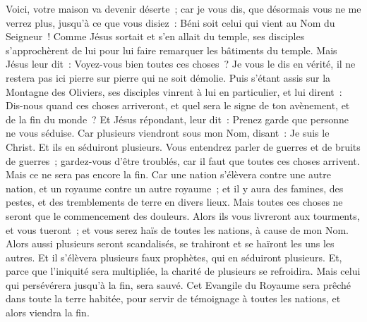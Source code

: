 \begin{multicols}{2}
Voici, votre maison va devenir déserte~;
car je vous dis, que désormais vous ne me verrez plus, jusqu'à ce que vous disiez~: Béni soit celui qui vient au Nom du Seigneur~!
\VerseOne{}Comme Jésus sortait et s'en allait du temple, ses disciples s'approchèrent de lui pour lui faire remarquer les bâtiments du temple.
Mais Jésus leur dit~: Voyez-vous bien toutes ces choses~? Je vous le dis en vérité, il ne restera pas ici pierre sur pierre qui ne soit démolie.
Puis s'étant assis sur la Montagne des Oliviers, ses disciples vinrent à lui en particulier, et lui dirent~: Dis-nous quand ces choses arriveront, et quel sera le signe de ton avènement, et de la fin du monde~?
Et Jésus répondant, leur dit~: Prenez garde que personne ne vous séduise.
Car plusieurs viendront sous mon Nom, disant~: Je suis le Christ. Et ils en séduiront plusieurs.
Vous entendrez parler de guerres et de bruits de guerres~; gardez-vous d'être troublés, car il faut que toutes ces choses arrivent. Mais ce ne sera pas encore la fin.
Car une nation s'élèvera contre une autre nation, et un royaume contre un autre royaume~; et il y aura des famines, des pestes, et des tremblements de terre en divers lieux.
Mais toutes ces choses ne seront que le commencement des douleurs.
Alors ils vous livreront aux tourments, et vous tueront~; et vous serez haïs de toutes les nations, à cause de mon Nom.
Alors aussi plusieurs seront scandalisés, se trahiront et se haïront les uns les autres.
Et il s'élèvera plusieurs faux prophètes, qui en séduiront plusieurs.
Et, parce que l'iniquité sera multipliée, la charité de plusieurs se refroidira.
Mais celui qui persévérera jusqu'à la fin, sera sauvé.
Cet Evangile du Royaume sera prêché dans toute la terre habitée, pour servir de témoignage à toutes les nations, et alors viendra la fin.

\end{multicols}
